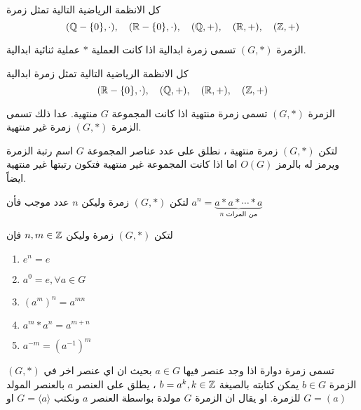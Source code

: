 \begin{example}
	كل الانظمة الرياضية التالية تمثل زمرة
	\[
	(\mathbb{Q}-\{0\}, \cdot), \quad(\mathbb{R}-\{0\}, \cdot),\quad (\mathbb{Q}, +) ,\quad (\mathbb{R}, +) ,\quad (\mathbb{Z}, +)
	\]
\end{example}

\begin{definition}
	الزمرة $(G, *)$ تسمى زمرة ابدالية اذا كانت العملية $*$ عملية ثنائية ابدالية.
\end{definition}

\begin{example}
	كل الانظمة الرياضية التالية تمثل زمرة ابدالية
	\[
	(\mathbb{R}-\{0\}, \cdot),\quad (\mathbb{Q}, +) ,\quad (\mathbb{R}, +) ,\quad (\mathbb{Z}, +)
	\]
\end{example}

\begin{definition}
	الزمرة $(G, * )$ تسمى زمرة منتهية اذا كانت المجموعة $G$ منتهية. عدا ذلك تسمى الزمرة $(G, *)$ زمرة غير منتهية. 
\end{definition}

\begin{definition}
	لتكن $(G, *)$ زمرة منتهية ، نطلق على عدد عناصر المجموعة $G$ اسم رتبة الزمرة ويرمز له بالرمز $O(G)$ اما اذا كانت المجموعة غير منتهية فتكون رتبتها غير منتهية ايضاً.
\end{definition}

\begin{definition}
	لتكن $(G, *)$ زمرة وليكن $n$ عدد موجب فأن 
	$a^n =\underbrace{a*a*\cdots*a}_{\text{$n$ من المرات}}$ 
\end{definition}

\begin{theorem}
	لتكن $(G, *)$ زمرة وليكن $n, m\in \mathbb{Z}$ فإن
	\setLR
	\begin{enumerate}[label=$\boxed{\arabic*}$]
		\item $e^n =e$
		\item $a^0 =e, \forall a\in G$
		\item $(a^m)^n = a^{mn}$
		\item $a^m * a^n = a^{m+n}$
		\item $a^{-m} = (a^{-1})^m$
	\end{enumerate}
\end{theorem}

\begin{definition}
	$(G, *)$ تسمى زمرة دوارة اذا وجد عنصر فيها $a\in G$ بحيث ان اي عنصر اخر في الزمرة $b\in G$ يمكن كتابته بالصيغة $b =a^k , k \in \mathbb{Z}$ ، يطلق على العنصر $a$ بالعنصر المولد للزمرة. او يقال ان الزمرة $G$ مولدة بواسطة العنصر $a$ ونكتب $G= \langle a\rangle$ او $G=(a)$
 \end{definition}

